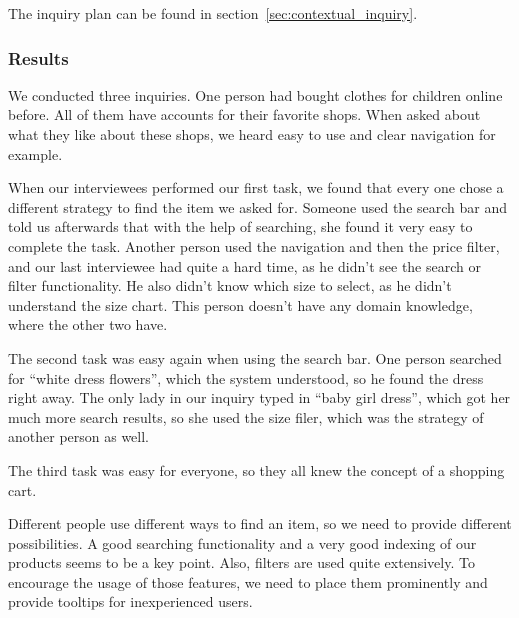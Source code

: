 The inquiry plan can be found in section~\ref{sec:contextual_inquiry}.

\subsubsection{Results}
We conducted three inquiries. One person had bought clothes for children online before. All of them have accounts for their favorite shops. When asked about what they like about these shops, we heard easy to use and clear navigation for example.

When our interviewees performed our first task, we found that every one chose a different strategy to find the item we asked for. Someone used the search bar and told us afterwards that with the help of searching, she found it very easy to complete the task. Another person used the navigation and then the price filter, and our last interviewee had quite a hard time, as he didn't see the search or filter functionality. He also didn't know which size to select, as he didn't understand the size chart. This person doesn't have any domain knowledge, where the other two have.

The second task was easy again when using the search bar. One person searched for ``white dress flowers'', which the system understood, so he found the dress right away. The only lady in our inquiry typed in ``baby girl dress'', which got her much more search results, so she used the size filer, which was the strategy of another person as well.

The third task was easy for everyone, so they all knew the concept of a shopping cart.

Different people use different ways to find an item, so we need to provide different possibilities. A good searching functionality and a very good indexing of our products seems to be a key point. Also, filters are used quite extensively. To encourage the usage of those features, we need to place them prominently and provide tooltips for inexperienced users. 
 
 


